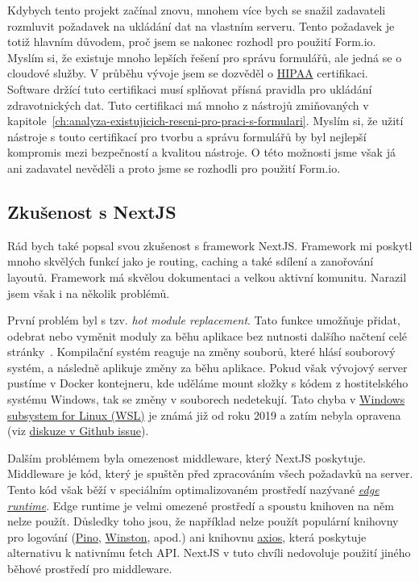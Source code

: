 Kdybych tento projekt začínal znovu, mnohem více bych se snažil zadavateli rozmluvit požadavek na ukládání dat na vlastním serveru.
Tento požadavek je totiž hlavním důvodem, proč jsem se nakonec rozhodl pro použití Form.io.
Myslím si, že existuje mnoho lepších řešení pro správu formulářů, ale jedná se o cloudové služby.
V průběhu vývoje jsem se dozvěděl o \href{https://www.hhs.gov/hipaa/index.html}{HIPAA} certifikaci.
Software držící tuto certifikaci musí splňovat přísná pravidla pro ukládání zdravotnických dat.
Tuto certifikaci má mnoho z nástrojů zmiňovaných v kapitole~\ref{ch:analyza-existujicich-reseni-pro-praci-s-formulari}.
Myslím si, že užití nástroje s touto certifikací pro tvorbu a správu formulářů by byl nejlepší kompromis mezi bezpečností a kvalitou nástroje.
O této možnosti jsme však já ani zadavatel nevěděli a proto jsme se rozhodli pro použití Form.io.

\subsection{Zkušenost s NextJS}\label{subsec:zkusenost-s-nextjs}

Rád bych také popsal svou zkušenost s framework NextJS\@.
Framework mi poskytl mnoho skvělých funkcí jako je routing, caching a také sdílení a zanořování layoutů.
Framework má skvělou dokumentaci a velkou aktivní komunitu.
Narazil jsem však i na několik problémů.

První problém byl s tzv. \textit{hot module replacement}.
Tato funkce umožňuje přidat, odebrat nebo vyměnit moduly za běhu aplikace bez nutnosti dalšího načtení celé stránky~\cite{hot-module-replacement-definition}.
Kompilační systém reaguje na změny souborů, které hlásí souborový systém, a následně aplikuje změny za běhu aplikace.
Pokud však vývojový server pustíme v Docker kontejneru, kde uděláme mount složky s kódem z hostitelského systému Windows, tak se změny v souborech nedetekují.
Tato chyba v \href{https://learn.microsoft.com/en-us/windows/wsl/about}{Windows subsystem for Linux (WSL)} je známá již od roku 2019 a zatím nebyla opravena (viz \href{https://github.com/microsoft/WSL/issues/4739}{diskuze v Github issue}).

Dalším problémem byla omezenost middleware, který NextJS poskytuje.
Middleware je kód, který je spuštěn před zpracováním všech požadavků na server.
Tento kód však běží v speciálním optimalizovaném prostředí nazývané \textit{\href{https://edge-runtime.vercel.app/}{edge runtime}}.
Edge runtime je velmi omezené prostředí a spoustu knihoven na něm nelze použít.
Důsledky toho jsou, že například nelze použít populární knihovny pro logování (\href{https://github.com/pinojs/pino}{Pino}, \href{https://github.com/winstonjs/winston}{Winston}, apod.) ani knihovnu \href{https://github.com/axios/axios}{axios}, která poskytuje alternativu k nativnímu fetch API\@.
NextJS v tuto chvíli nedovoluje použití jiného běhové prostředí pro middleware.

